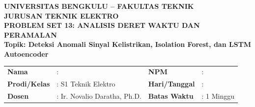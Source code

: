 \documentclass[11pt,a4paper]{article}
\begin{document}
\begin{center}
    {\large \textbf{\color{primaryblue}UNIVERSITAS BENGKULU -- FAKULTAS TEKNIK}}\\[0.1cm]
    {\large \textbf{\color{secondaryblue}JURUSAN TEKNIK ELEKTRO}}\\[0.2cm]
    {\LARGE \textbf{\color{primaryblue}PROBLEM SET 13: ANALISIS DERET WAKTU DAN PERAMALAN}}\\[0.1cm]
    {\normalsize \textbf{Topik: Deteksi Anomali Sinyal Kelistrikan, Isolation Forest, dan LSTM Autoencoder}}
\end{center}

\vspace{0.1cm}

\begin{tcolorbox}[colback=boxbg,colframe=primaryblue,arc=2mm,title=\textbf{Informasi Tugas \& Identitas Mahasiswa}]
\small
\begin{tabular}{p{2.2cm}p{5.5cm}p{2.2cm}p{5.0cm}}
\textbf{Nama} & : \dotfill & \textbf{NPM} & : \dotfill \\
\textbf{Prodi/Kelas} & : S1 Teknik Elektro & \textbf{Hari/Tanggal} & : \dotfill \\
\textbf{Dosen} & : Ir. Novalio Daratha, Ph.D. & \textbf{Batas Waktu} & : 1 Minggu \\
\end{tabular}
\end{tcolorbox}

\vspace{0.2cm}
\end{document}
